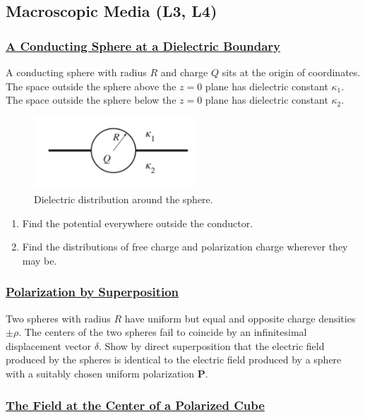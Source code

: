 \subsection{Macroscopic Media (\textbf{L3, L4})}

\subsubsection{\hyperref[A Conducting Sphere at a Dielectric Boundary]{A Conducting Sphere at a Dielectric Boundary}}

A conducting sphere with radius $R$ and charge $Q$ sits at the origin of coordinates. The space outside the sphere above the $z=0$ plane has dielectric constant $\kappa_{1}$. The space outside the sphere below the $z=0$ plane has dielectric constant $\kappa_{2}$.

\begin{figure}[h]
	\includegraphics[width=6cm]{figures/spheredielectric.png}
	\centering
	\caption{Dielectric distribution around the sphere.}
\end{figure}

\begin{enumerate}
	\item  Find the potential everywhere outside the conductor.
	\item  Find the distributions of free charge and polarization charge wherever they may be.
\end{enumerate}

\subsubsection{\hyperref[Polarization by Superposition]{Polarization by Superposition}}

Two spheres with radius $R$ have uniform but equal and opposite charge densities $\pm \rho .$ The centers of the two spheres fail to coincide by an infinitesimal displacement vector $\delta$. Show by direct superposition that the electric field produced by the spheres is identical to the electric field produced by a sphere with a suitably chosen uniform polarization $\mathbf{P}$.

\subsubsection{\hyperref[The Field at the Center of a Polarized Cube]{The Field at the Center of a Polarized Cube}}

